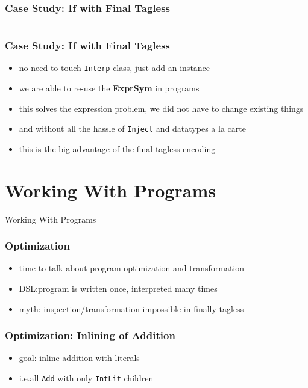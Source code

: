\documentclass[aspectratio=169, hyperref={colorlinks, linkcolor=beamer@centricgreen}, urlcolor=links]{beamer}
\begin{document}
\begin{frame}[fragile]
  \frametitle{Case Study: If with Final Tagless}
  \inputminted[fontsize=\footnotesize]{scala}{snippets/final-tagless-interp-if.scala}
\end{frame}

\begin{frame}
  \frametitle{Case Study: If with Final Tagless}
  \begin{itemize}
  \item no need to touch \texttt{Interp} class, just add an instance
  \item we are able to re-use the \textbf{ExprSym} in programs
  \item this solves the expression problem, we did not have to change existing things
  \item and without all the hassle of \texttt{Inject} and datatypes a la carte
  \item this is the big advantage of the final tagless encoding
  \end{itemize}
\end{frame}

\section{Working With Programs}\label{sec:working-with-programs}

\begin{frame}
  \begin{center}
    \Huge
    Working With Programs
  \end{center}
\end{frame}

\begin{frame}
  \frametitle{Optimization}
  \begin{itemize}
  \item time to talk about program optimization and transformation
  \item DSL:\@ program is written once, interpreted many times
  \item myth: inspection/transformation impossible in finally tagless
  \end{itemize}
\end{frame}

\begin{frame}
  \frametitle{Optimization: Inlining of Addition}
  \begin{itemize}
  \item goal: inline addition with literals
  \item i.e.\@ all \texttt{Add} with only \texttt{IntLit} children
  \end{itemize}
\end{frame}
\end{document}

